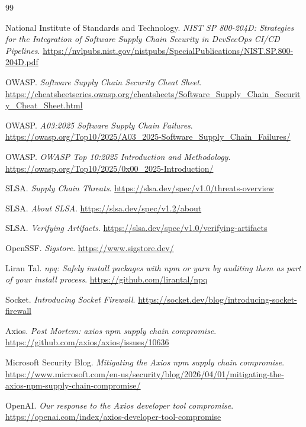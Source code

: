 \documentclass[12pt,a4paper]{article}
\begin{document}
\newpage
\begin{thebibliography}{99}

National Institute of Standards and Technology.
\textit{NIST SP 800-204D: Strategies for the Integration of Software Supply Chain Security in DevSecOps CI/CD Pipelines}.
\url{https://nvlpubs.nist.gov/nistpubs/SpecialPublications/NIST.SP.800-204D.pdf}

OWASP.
\textit{Software Supply Chain Security Cheat Sheet}.
\url{https://cheatsheetseries.owasp.org/cheatsheets/Software_Supply_Chain_Security_Cheat_Sheet.html}

OWASP.
\textit{A03:2025 Software Supply Chain Failures}.
\url{https://owasp.org/Top10/2025/A03_2025-Software_Supply_Chain_Failures/}

OWASP.
\textit{OWASP Top 10:2025 Introduction and Methodology}.
\url{https://owasp.org/Top10/2025/0x00_2025-Introduction/}

SLSA.
\textit{Supply Chain Threats}.
\url{https://slsa.dev/spec/v1.0/threats-overview}

SLSA.
\textit{About SLSA}.
\url{https://slsa.dev/spec/v1.2/about}

SLSA.
\textit{Verifying Artifacts}.
\url{https://slsa.dev/spec/v1.0/verifying-artifacts}

OpenSSF.
\textit{Sigstore}.
\url{https://www.sigstore.dev/}

Liran Tal.
\textit{npq: Safely install packages with npm or yarn by auditing them as part of your install process}.
\url{https://github.com/lirantal/npq}

Socket.
\textit{Introducing Socket Firewall}.
\url{https://socket.dev/blog/introducing-socket-firewall}

Axios.
\textit{Post Mortem: axios npm supply chain compromise}.
\url{https://github.com/axios/axios/issues/10636}

Microsoft Security Blog.
\textit{Mitigating the Axios npm supply chain compromise}.
\url{https://www.microsoft.com/en-us/security/blog/2026/04/01/mitigating-the-axios-npm-supply-chain-compromise/}

OpenAI.
\textit{Our response to the Axios developer tool compromise}.
\url{https://openai.com/index/axios-developer-tool-compromise}


\end{thebibliography}
\end{document}

